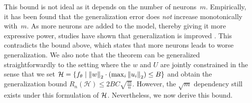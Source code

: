 This bound is not ideal as it depends on the number of neurons~$m$. Empirically, it has been found that the generalization error does \emph{not} increase monotonically with~$m$. As more neurons are added to the model, thereby giving it more expressive power, studies have shown that generalization is improved \cite{belkin2019}. This contradicts the bound above, which states that more neurons leads to worse generalization. We also note that the theorem can be generalized straightforwardly to the setting where the $w$ and $U$ are jointly constrained in the sense that we set $\mathcal{H} = \left\{ f_\theta \mid \left\|w\right\|_2\cdot \left(\max_i\left\|u_i\right\|_2\right) \leq B\right\}$ and obtain the generalization bound $        R_n(\mathcal{H}) \le 2 B C\sqrt{\frac{m}{n}}.$ However, the $\sqrt{m}$ dependency still exists under this formulation of $\mathcal H$. 
Nevertheless, we now derive this bound.

